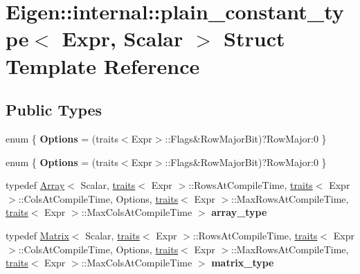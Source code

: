\hypertarget{struct_eigen_1_1internal_1_1plain__constant__type}{}\section{Eigen\+:\+:internal\+:\+:plain\+\_\+constant\+\_\+type$<$ Expr, Scalar $>$ Struct Template Reference}
\label{struct_eigen_1_1internal_1_1plain__constant__type}
\subsection*{Public Types}
\begin{DoxyCompactItemize}
\item 
\mbox{\label{struct_eigen_1_1internal_1_1plain__constant__type_ab18655942249595dd4c005378a85bd10}} 
enum \{ {\bfseries Options} = (traits$<$Expr$>$\+:\+:Flags\&Row\+Major\+Bit)?Row\+Major\+:0
 \}
\item 
\mbox{\label{struct_eigen_1_1internal_1_1plain__constant__type_a6ab9008dfff8ae1ea4d2f861add2bbf0}} 
enum \{ {\bfseries Options} = (traits$<$Expr$>$\+:\+:Flags\&Row\+Major\+Bit)?Row\+Major\+:0
 \}
\item 
\mbox{\label{struct_eigen_1_1internal_1_1plain__constant__type_ace743ed455e55302961c46cbcf246eba}} 
typedef \hyperlink{group___core___module_class_eigen_1_1_array}{Array}$<$ Scalar, \hyperlink{struct_eigen_1_1internal_1_1traits}{traits}$<$ Expr $>$\+::Rows\+At\+Compile\+Time, \hyperlink{struct_eigen_1_1internal_1_1traits}{traits}$<$ Expr $>$\+::Cols\+At\+Compile\+Time, Options, \hyperlink{struct_eigen_1_1internal_1_1traits}{traits}$<$ Expr $>$\+::Max\+Rows\+At\+Compile\+Time, \hyperlink{struct_eigen_1_1internal_1_1traits}{traits}$<$ Expr $>$\+::Max\+Cols\+At\+Compile\+Time $>$ {\bfseries array\+\_\+type}
\item 
\mbox{\label{struct_eigen_1_1internal_1_1plain__constant__type_a3bf684861bb8d5a498cb07986637d61f}} 
typedef \hyperlink{group___core___module_class_eigen_1_1_matrix}{Matrix}$<$ Scalar, \hyperlink{struct_eigen_1_1internal_1_1traits}{traits}$<$ Expr $>$\+::Rows\+At\+Compile\+Time, \hyperlink{struct_eigen_1_1internal_1_1traits}{traits}$<$ Expr $>$\+::Cols\+At\+Compile\+Time, Options, \hyperlink{struct_eigen_1_1internal_1_1traits}{traits}$<$ Expr $>$\+::Max\+Rows\+At\+Compile\+Time, \hyperlink{struct_eigen_1_1internal_1_1traits}{traits}$<$ Expr $>$\+::Max\+Cols\+At\+Compile\+Time $>$ {\bfseries matrix\+\_\+type}

\end{DoxyCompactItemize}
